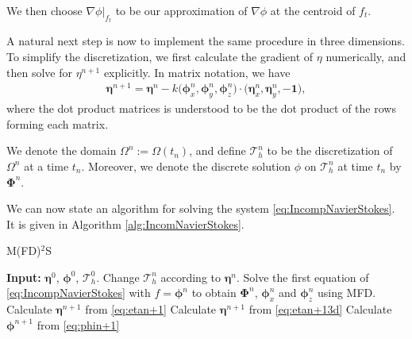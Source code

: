 \documentclass[11pt]{article}
\begin{document}
We then choose $\nabla \phi|_{f_t}$ to be our approximation of $\nabla \phi$ at the centroid of $f_t$.

A natural next step is now to implement the same procedure in three dimensions. To simplify the discretization, we first calculate
the gradient of $\eta$ numerically, and then solve for $\eta^{n+1}$ explicitly. In matrix notation, we have
\begin{align}
    \label{eq:etan+13d}
    \bm{\eta}^{n+1} = \bm{\eta}^n - k \big(\bm{\phi}_x^n, \bm{\phi}_y^n, \bm{\phi}_z^n\big)\cdot(\bm{\eta}_x^n, \bm{\eta}_y^n, -\bm{1}\big),
\end{align}
where the dot product matrices is understood to be the dot product of the rows forming each matrix.

We denote the domain $\Omega^n := \Omega(t_n)$, and define $\mathcal{T}_h^n$ to be the discretization of $\Omega^n$
at a time $t_n$. Moreover, we denote the discrete solution $\phi$ on $\mathcal{T}_h^n$ at time $t_n$ by $\bm{\Phi}^n$.

We can now state an algorithm for solving the system \eqref{eq:IncompNavierStokes}. It is given in Algorithm \eqref{alg:IncomNavierStokes}.
%
%
\begin{algorithm}
    \caption{M(FD)$^2$S}
    \begin{algorithmic}[1]
    \State    \textbf{Input:} $\bm{\eta}^0$, $\bm{\phi}^0$, $\mathcal{T}_h^0$.
	    \State    Change $\mathcal{T}_h^n$ according to $\bm{\eta}^n$.
            \State    Solve the first equation of \eqref{eq:IncompNavierStokes} with $f = \bm{\phi}^n$ to obtain
                      $\bm{\Phi}^{n}$, $\bm{\phi}_x^n$ and $\bm{\phi}_z^n$ using MFD.
                \State    Calculate $\bm{\eta}^{n+1}$ from \eqref{eq:etan+1}
			    \State    Calculate $\bm{\eta}^{n+1}$ from \eqref{eq:etan+13d}
			\EndIf
        \State    Calculate $\bm{\phi}^{n+1}$ from \eqref{eq:phin+1}
        \EndFor
	\end{algorithmic}
	\label{alg:IncomNavierStokes}
\end{algorithm}
%
%
\end{document}
